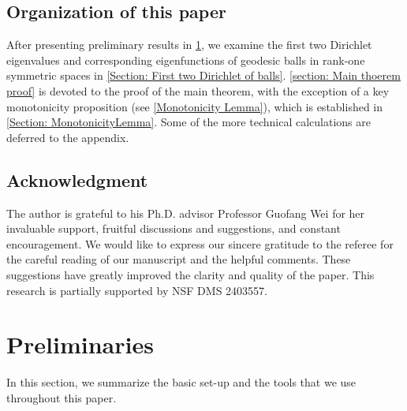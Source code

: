 \documentclass{amsart}
\numberwithin{equation}{section}
\theoremstyle{plain}
\theoremstyle{definition}
\theoremstyle{remark}
\begin{document}


\subsection{Organization of this paper}

After presenting preliminary results in \cref{section: Preliminaries}, we examine the first two Dirichlet eigenvalues and corresponding eigenfunctions of geodesic balls in rank-one symmetric spaces in \cref{Section: First two Dirichlet of balls}. \cref{section: Main thoerem proof} is devoted to the proof of the main theorem, with the exception of a key monotonicity proposition (see \cref{Monotonicity Lemma}), which is established in \cref{Section: MonotonicityLemma}. Some of the more technical calculations are deferred to the appendix.



\subsection*{Acknowledgment}
The author is grateful to his Ph.D. advisor Professor Guofang Wei for her invaluable support, fruitful discussions and suggestions, and constant encouragement. We would like to express our sincere gratitude to the referee for the careful reading of our manuscript and the helpful comments. These suggestions have greatly improved the clarity and quality of the paper. This research is partially supported by NSF DMS 2403557.





\section{Preliminaries}\label{section: Preliminaries}
In this section, we summarize the basic set-up and the tools that we use throughout this paper.
\end{document}
